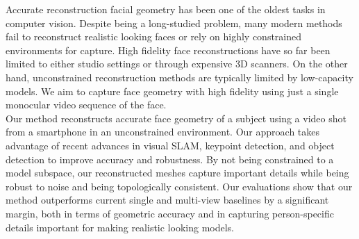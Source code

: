 Accurate reconstruction facial geometry has been one of the oldest tasks in computer vision. Despite being a long-studied problem, many modern methods fail to reconstruct realistic looking faces or rely on highly constrained environments for capture. High fidelity face reconstructions have so far been limited to either studio settings
or through expensive 3D scanners. On the other hand,
unconstrained reconstruction methods are typically limited
by low-capacity models. We aim to capture face geometry with high fidelity using just a single monocular video sequence of the face.\\

Our method reconstructs accurate face geometry of a subject using a video shot from a smartphone in an unconstrained environment. Our approach takes advantage of recent advances in visual SLAM,
keypoint detection, and object detection to improve accuracy and robustness. By not being constrained to a model
subspace, our reconstructed meshes capture important details while being robust to noise and being topologically
consistent. Our evaluations show that our method outperforms current single and multi-view baselines by a significant margin, both in terms of geometric accuracy and in
capturing person-specific details important for making realistic looking models.